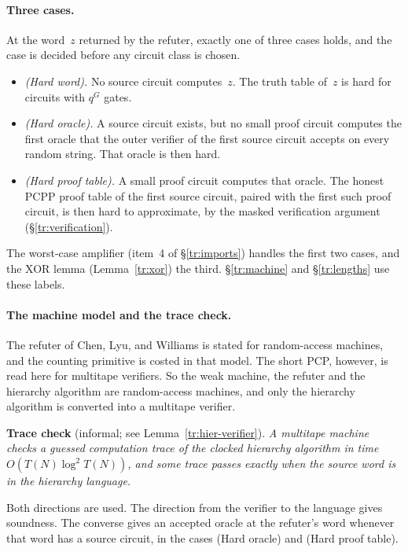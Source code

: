 \documentclass[11pt,letterpaper]{article}
\theoremstyle{definition}
\theoremstyle{remark}
\begin{document}
\paragraph{Three cases.} At the word~$z$ returned by the refuter,
exactly one of three cases holds, and the case is decided before any
circuit class is chosen.
\begin{itemize}
\item \emph{(Hard word).} No source circuit computes~$z$. The truth
table of~$z$ is hard for circuits with $q^G$ gates.
\item \emph{(Hard oracle).} A source circuit exists, but no small proof
circuit computes the first oracle that the outer verifier of the first
source circuit accepts on every random string. That oracle is then
hard.
\item \emph{(Hard proof table).} A small proof circuit computes that
oracle. The honest PCPP proof table of the first source circuit, paired
with the first such proof circuit, is then hard to approximate, by the
masked verification argument (\S\ref{tr:verification}).
\end{itemize}
The worst-case amplifier (item~4 of \S\ref{tr:imports}) handles the
first two cases, and the XOR lemma (Lemma~\ref{tr:xor}) the third. \S\ref{tr:machine} and \S\ref{tr:lengths} use these
labels.

\paragraph{The machine model and the trace check.} The refuter of Chen,
Lyu, and Williams is stated for random-access machines, and the counting
primitive is costed in that model. The short PCP, however, is read
here for multitape verifiers. So the weak machine, the refuter and the
hierarchy algorithm are random-access machines, and only the hierarchy
algorithm is converted into a multitape verifier.

\smallskip\noindent\textbf{Trace check} (informal; see
Lemma~\ref{tr:hier-verifier}). \emph{A multitape machine checks a
guessed computation trace of the clocked hierarchy algorithm in time
$O(T(N)\log^2T(N))$, and some trace passes exactly when the source word is
in the hierarchy language.}

\smallskip\noindent Both directions are used. The direction from the
verifier to the language gives soundness. The converse gives an
accepted oracle at the refuter's word whenever that word has a source
circuit, in the cases (Hard oracle) and (Hard proof table).
\end{document}
